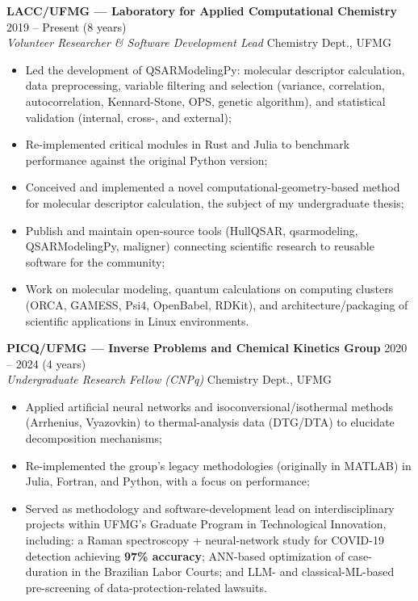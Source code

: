 \documentclass[10pt,a4paper]{article}
\newcommand{\entry}[4]{%
  \textbf{\sffamily\large #1} \hfill #2 \\
  {\itshape #3} \hfill {\small #4} \\[-0.75em]
}
\begin{document}
\entry{LACC/UFMG --- Laboratory for Applied Computational Chemistry}{2019 -- Present (8 years)}{Volunteer Researcher \& Software Development Lead}{Chemistry Dept., UFMG}
\begin{itemize}\footnotesize
  \item Led the development of QSARModelingPy: molecular descriptor calculation, data preprocessing, variable filtering and selection (variance, correlation, autocorrelation, Kennard-Stone, OPS, genetic algorithm), and statistical validation (internal, cross-, and external);
  \item Re-implemented critical modules in Rust and Julia to benchmark performance against the original Python version;
  \item Conceived and implemented a novel computational-geometry-based method for molecular descriptor calculation, the subject of my undergraduate thesis;
  \item Publish and maintain open-source tools (HullQSAR, qsarmodeling, QSARModelingPy, maligner) connecting scientific research to reusable software for the community;
  \item Work on molecular modeling, quantum calculations on computing clusters (ORCA, GAMESS, Psi4, OpenBabel, RDKit), and architecture/packaging of scientific applications in Linux environments.
\end{itemize}

\vspace{0.7em}

\entry{PICQ/UFMG --- Inverse Problems and Chemical Kinetics Group}{2020 -- 2024 (4 years)}{Undergraduate Research Fellow (CNPq)}{Chemistry Dept., UFMG}
\begin{itemize}\footnotesize
  \item Applied artificial neural networks and isoconversional/isothermal methods (Arrhenius, Vyazovkin) to thermal-analysis data (DTG/DTA) to elucidate decomposition mechanisms;
  \item Re-implemented the group's legacy methodologies (originally in MATLAB) in Julia, Fortran, and Python, with a focus on performance;
  \item Served as methodology and software-development lead on interdisciplinary projects within UFMG's Graduate Program in Technological Innovation, including: a Raman spectroscopy + neural-network study for COVID-19 detection achieving \textbf{97\% accuracy}; ANN-based optimization of case-duration in the Brazilian Labor Courts; and LLM- and classical-ML-based pre-screening of data-protection-related lawsuits.
\end{itemize}
\end{document}
